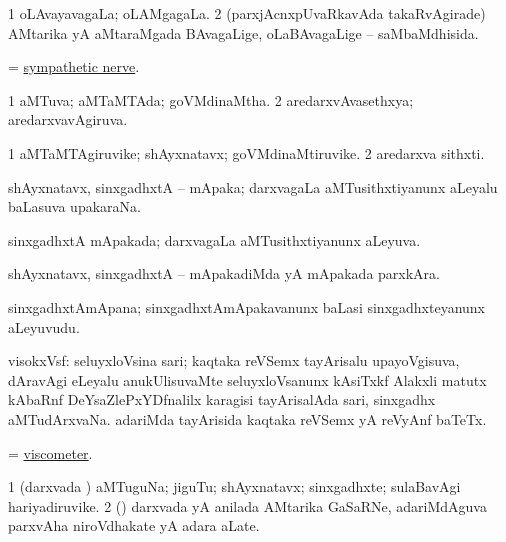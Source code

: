 \bentry 
{} 
\gl{\gu}
\expl{}
\bmng
\bnum
\num{1} oLAvayavagaLa; oLAMgagaLa. 
\num{2} (parxjAcnxpUvaRkavAda takaRvAgirade) AMtarika yA aMtaraMgada BAvagaLige, oLaBAvagaLige -- saMbaMdhisida. 
\enum
\emng
\eentry

\bentry 
{}
\gl{\nA}
\expl{}
\bmng
 = \hyperref{kandict_s.pdf}{S}{sympathetic nerve}{sympathetic nerve}. 
\emng
\eentry

\bentry 
{} 
\gl{\gu}
\expl{}
\bmng
\bnum
\num{1} aMTuva; aMTaMTAda; goVMdinaMtha. 
\num{2} aredarxvAvasethxya; aredarxvavAgiruva. 
\enum
\emng
\eentry

\bentry
{} 
\gl{\nA}
\expl{}
\bmng
\bnum
\num{1} aMTaMTAgiruvike; shAyxnatavx; goVMdinaMtiruvike. 
\num{2} aredarxva sithxti. 
\enum
\emng
\eentry

\bentry
{} 
\gl{\nA}
\expl{}
\bmng
 shAyxnatavx, sinxgadhxtA -- mApaka; darxvagaLa aMTusithxtiyanunx aLeyalu baLasuva upakaraNa. 
\emng
\eentry

\bentry 
{} 
\gl{\gu}
\expl{}
\bmng
 sinxgadhxtA mApakada; darxvagaLa aMTusithxtiyanunx aLeyuva. 
\emng
\eentry

\bentry
{} 
\gl{\kirxvi}
\expl{}
\bmng
 shAyxnatavx, sinxgadhxtA -- mApakadiMda yA mApakada parxkAra. 
\emng
\eentry

\bentry
{} 
\gl{\nA}
\expl{}
\bmng
 sinxgadhxtAmApana; sinxgadhxtAmApakavanunx baLasi sinxgadhxteyanunx aLeyuvudu. 
\emng
\eentry

\bentry
{} 
\gl{\nA}
\expl{}
\bmng
 visokxVsf: 
\banum
{} seluyxloVsina sari; kaqtaka reVSemx tayArisalu upayoVgisuva, dAravAgi eLeyalu anukUlisuvaMte seluyxloVsanunx kAsiTxkf Alakxli matutx kAbaRnf DeYsaZlePxYDfnalilx karagisi tayArisalAda sari, sinxgadhx aMTudArxvaNa. 
 adariMda tayArisida kaqtaka reVSemx yA reVyAnf baTeTx. 
\eanum
\emng
\eentry


\bentry 
{} 
\gl{\nA}
\expl{}
\bmng
 = \hyperlink{viscometer}{viscometer}. 
\emng
\eentry

\bentry
{} 
\gl{\nA}
\expl{}
\bmng
\bnum
\num{1} (darxvada \vi) aMTuguNa; jiguTu; shAyxnatavx; sinxgadhxte; sulaBavAgi hariyadiruvike. 
\num{2} (\Bwvi) darxvada yA anilada AMtarika GaSaRNe, adariMdAguva parxvAha niroVdhakate yA adara aLate. 
\enum
\emng

